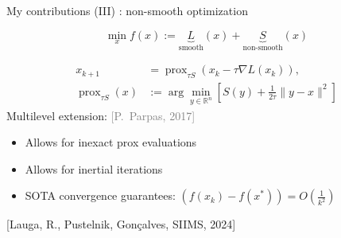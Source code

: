 \documentclass{beamer}
\begin{document}
\begin{frame}{My contributions (III) : non-smooth optimization }

$$
\min_x f(x):=\underbrace{L}_{\text{smooth}}(x)+\underbrace{S}_{\text{non-smooth}}(x)
$$
\begin{footnotesize}

\end{footnotesize}
\begin{tcolorbox}[
      title=Forward-backward iterations,
      colback=white,
      colframe=gray!40,
      boxrule=0.4pt,
      arc=4pt,
      left=6pt, right=6pt, top=0pt, bottom=4pt,
    ]
    \vspace{-0.3cm}
\begin{align*}
x_{k+1}&=\operatorname{prox}_{\tau S}(x_k-\tau \nabla L(x_k)),\\
\operatorname{prox}_{\tau S}(x)&:=\arg\min_{y\in\mathbb{R}^n}\left[S(y)+\frac{1}{2\tau}\|y-x\|^2\right]
\end{align*}
 \vspace{-0.3cm}
Multilevel extension: {\small
\textcolor{gray}{%
[P.~Parpas, 2017]}}
\vspace{0.1cm}


\end{tcolorbox}







	\begin{footnotesize}
\begin{tcolorbox}[
        title={ Multilevel inexact inertial proximal method },
    colback=green!10,
    colframe=green!70!black,
        fonttitle=\bfseries,
]
\begin{itemize}
\item Allows for inexact prox evaluations
\item Allows for inertial iterations
\item SOTA convergence guarantees: $\left(f(x_k)-f(x^*)\right)=O\left(\frac{1}{k^2}\right)$\\
\end{itemize}
\end{tcolorbox}
\end{footnotesize}
\footnotesize{ \textcolor{mygreen}{[Lauga, R., Pustelnik, Gonçalves, SIIMS, 2024]}}


\end{frame}
\end{document}
